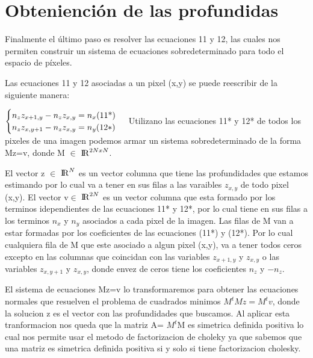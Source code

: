 \section{Obteniención de las profundidas}	

Finalmente el último paso es resolver las ecuaciones 11 y 12, las cuales nos permiten construir un sistema de ecuaciones sobredeterminado para todo el espacio de píxeles.\par
Las ecuaciones 11 y 12 asociadas a un pixel (x,y) se puede reescribir de la siguiente manera:\par
$\begin{cases}
n_{z} z_{x+1,y} - n_{z} z_{x,y}= n_{x} \text{(11*)}\\
n_{z} z_{x,y+1} - n_{z} z_{x,y}= n_{y}\text(12*)
\end{cases}$
\break
\indent Utilizano las ecuaciones 11* y 12* de todos los pixeles de una imagen podemos armar un sistema sobredeterminado de la forma Mz=v, donde M $\in$ ${\rm I\!R}^{2NxN}$. \par
\indent El vector z $\in$ ${\rm I\!R}^{N}$ es un vector columna que tiene las profundidades que estamos estimando por lo cual va a tener en sus filas a las varaibles $z_{x,y}$ de todo pixel (x,y). El vector v$\in$ ${\rm I\!R}^{2N}$ es un vector columna que esta formado por los terminos idependientes de las ecuaciones 11* y 12*, por lo cual tiene en sus filas a los terminos $n_{x}$ y $n_{y}$ asociados a cada pixel de la imagen. Las filas de M van a estar formadas por los coeficientes de las ecuaciones (11*) y (12*). Por lo cual cualquiera fila de M que este asociado a algun pixel (x,y), va a tener todos ceros excepto en las columnas que coincidan con las variables $z_{x+1,y}$ y $z_{x,y}$ o las variables  $z_{x,y+1}$ y $z_{x,y}$, donde envez de ceros tiene los coeficientes $n_{z}$ y $-n_{z}$.\par 
\indent El sistema de ecuaciones Mz=v lo transformaremos para obtener las ecuaciones normales que resuelven el problema de cuadrados minimos $M^{t}Mz=M^{t}v$, donde la solucion z es el vector con las profundidades que buscamos. Al aplicar esta tranformacion nos queda que la matriz A= $M^{t}$M es simetrica definida positiva lo cual nos permite usar el metodo de factorizacion de choleky ya que sabemos que una matriz es simetrica definida positiva si y solo si tiene factorizacion cholesky.\par


